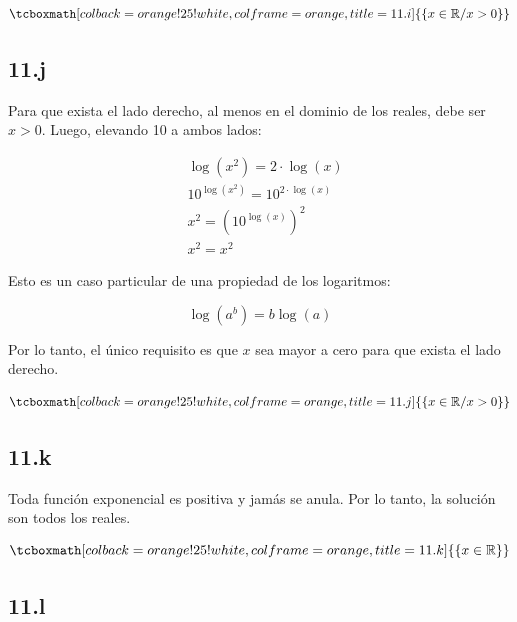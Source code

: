 \documentclass{article}
\newcommand{\hresult}[2]{\tcboxmath[colback=orange!25!white,colframe=orange, title=#1] {#2} }
\begin{document}
\begin{equation}
\hresult{11.i}{ \{ x \in \mathbb{R} / x > 0 \} }
\end{equation}

\subsection*{11.j}
\label{subsec:11.j}

Para que exista el lado derecho, al menos en el dominio de los reales, debe ser $ x > 0 $. Luego, elevando 10 a ambos lados:

\begin{subequations}
\begin{align}
& \log(x^2) = 2 \cdot \log(x) \\
& 10^{ \log(x^2) } = 10^{ 2 \cdot \log(x) } \\
& x^2 = (10^{\log(x)})^2 \\
& x^2 = x^2
\end{align}
\end{subequations}

Esto es un caso particular de una propiedad de los logaritmos:

\begin{equation}
\log(a^b) = b \log(a)
\end{equation}

Por lo tanto, el único requisito es que $x$ sea mayor a cero para que exista el lado derecho.

\begin{equation}
\hresult{11.j}{ \{ x \in \mathbb{R} / x > 0 \} }
\end{equation}

\subsection*{11.k}
\label{subsec:11.k}

Toda función exponencial es positiva y jamás se anula. Por lo tanto, la solución son todos los reales.

\begin{equation}
\hresult{11.k}{ \{ x \in \mathbb{R} \} }
\end{equation}

\subsection*{11.l}
\label{subsec:11.l}
\end{document}
